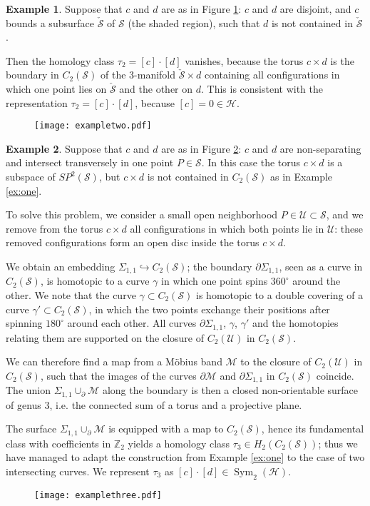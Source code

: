 \documentclass{amsart}
\theoremstyle{plain}
\theoremstyle{definition}
\newtheorem{ex}{Example}
\renewcommand{\H}{\mathcal{H}}
\newcommand{\M}{\mathcal{M}}
\renewcommand{\S}{\mathcal{S}}
\newcommand{\U}{\mathcal{U}}
\newcommand{\Z}{\mathbb{Z}}
\newcommand{\SP}{S\!P}
\DeclareMathOperator{\Sym}{Sym}
\begin{document}
\begin{ex}
 \label{ex:two}
Suppose that $c$ and $d$ are as in Figure \ref{fig:exampletwo}:
$c$ and $d$ are disjoint, and
 $c$ bounds a subsurface $\check{\S}$ of $\S$ (the shaded region), such that $d$ is not contained in $\check{\S}$.
 
 Then the homology class $\tau_2=[c]\cdot[d]$ vanishes, because the torus $c\times d$ is the boundary in $C_2(\S)$
 of the 3-manifold $\check{\S}\times d$ containing all configurations in which one point lies on $\check{\S}$ and
 the other on $d$. This is consistent with the representation $\tau_2=[c]\cdot[d]$, because $[c]=0\in \H$.
\end{ex}
\begin{figure}[ht]\centering
 \texttt{[image: exampletwo.pdf]}
 \caption{}
\label{fig:exampletwo}
\end{figure}

\begin{ex}
 \label{ex:three}
 Suppose that $c$ and $d$ are as in Figure \ref{fig:examplethree}: $c$ and $d$ are non-separating and 
intersect transversely in one point $P\in\S$. In this case the torus $c\times d$ is a subspace
of $\SP^2(\S)$, but $c\times d$ is not contained in $C_2(\S)$ as in Example \ref{ex:one}.

To solve this problem, we consider a small open neighborhood $P\in \U\subset\S$, and we remove from the torus $c\times d$
all configurations in which both points lie in $\U$: these removed configurations form an open disc inside the torus $c\times d$.

We obtain an embedding $\Sigma_{1,1}\hookrightarrow C_2(\S)$;
the boundary $\partial\Sigma_{1,1}$,
seen as a curve in $C_2(\S)$, is homotopic to a curve $\gamma$ in which one point spins $360^{\circ}$ around the other.
We note that the curve $\gamma\subset C_2(\S)$ is homotopic to a double covering of a curve $\gamma'\subset C_2(\S)$,
in which the two points exchange their positions after spinning $180^{\circ}$ around each other. All curves
$\partial\Sigma_{1,1}$, $\gamma$, $\gamma'$ and the homotopies relating them
are supported on the closure of $C_2(\U)$ in $C_2(\S)$.

We can therefore find a map from a M\"{o}bius band $\M$ to the closure of $C_2(\U)$ in $C_2(\S)$,
such that the images of the curves $\partial\M$ and $\partial\Sigma_{1,1}$ in $C_2(\S)$ coincide.
The union $\Sigma_{1,1}\cup_{\partial}\M$ along the boundary is then a closed
non-orientable surface of genus $3$, i.e. the connected sum of a torus and a projective plane.

The surface $\Sigma_{1,1}\cup_{\partial}\M$ is equipped with a map to $C_2(\S)$, hence its fundamental class with coefficients
in $\Z_2$ yields a homology class $\tau_3\in H_2(C_2(\S))$; thus we have managed to adapt
the construction from Example \ref{ex:one} to the case of two intersecting curves. We represent $\tau_3$
as $[c]\cdot[d]\in\Sym_2(\H)$.
\end{ex}
\begin{figure}[ht]\centering
 \texttt{[image: examplethree.pdf]}
 \caption{}
\label{fig:examplethree}
\end{figure}
\end{document}
